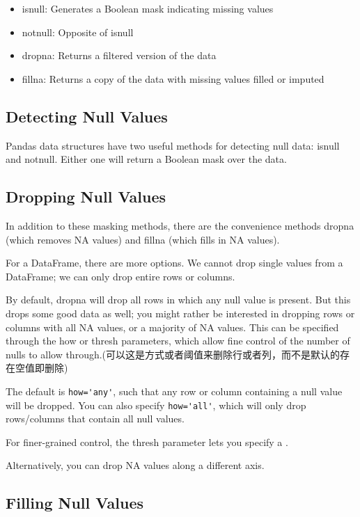 \begin{itemize}
    \item isnull: Generates a Boolean mask indicating missing values
    \item notnull: Opposite of isnull
    \item dropna: Returns a filtered version of the data
    \item fillna: Returns a copy of the data with missing values filled or imputed
\end{itemize}
\subsection*{Detecting Null Values}
Pandas data structures have two useful methods for detecting null data: isnull and
notnull. Either one will return a Boolean mask over the data.

\subsection*{Dropping Null Values}
In addition to these masking methods, there are the convenience methods dropna
(which removes NA values) and fillna (which fills in NA values).

For a DataFrame, there are more options. We cannot drop single values from a DataFrame; we can only drop entire rows or columns.

By default, dropna will drop all rows in which any null value is present. But this drops some good data as well; you might rather be interested in dropping
rows or columns with all NA values, or a majority of NA values. This can be specified
through the how or thresh parameters, which allow fine control of the number of
nulls to allow through.(可以这是方式或者阈值来删除行或者列，而不是默认的存在空值即删除)

The default is \verb|how='any'|, such that any row or column containing a null value will be dropped. You can also specify \verb|how='all'|, which will only drop rows/columns that contain all null values.

For finer-grained control, the thresh parameter lets you specify a .

Alternatively, you can drop NA values along a different axis.

\subsection*{Filling Null Values}

